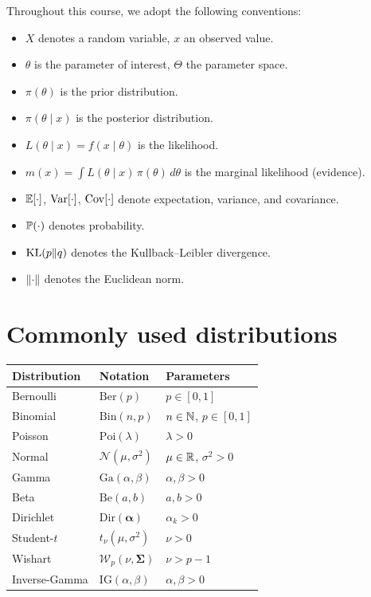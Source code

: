 Throughout this course, we adopt the following conventions:

\begin{itemize}
  \item $X$ denotes a random variable, $x$ an observed value.
  \item $\theta$ is the parameter of interest, $\Theta$ the parameter
        space.
  \item $\pi(\theta)$ is the prior distribution.
  \item $\pi(\theta \mid x)$ is the posterior distribution.
  \item $L(\theta \mid x) = f(x \mid \theta)$ is the likelihood.
  \item $m(x) = \int L(\theta \mid x)\,\pi(\theta)\,d\theta$ is the
        marginal likelihood (evidence).
  \item $\mathbb{E}[\cdot]$, $\mathrm{Var}[\cdot]$, $\mathrm{Cov}[\cdot]$ denote
        expectation, variance, and covariance.
  \item $\mathbb{P}(\cdot)$ denotes probability.
  \item $\mathrm{KL}(p \| q)$ denotes the Kullback--Leibler divergence.
  \item $\left\| \cdot \right\|$ denotes the Euclidean norm.
\end{itemize}

\section*{Commonly used distributions}

\begin{center}
\renewcommand{\arraystretch}{1.3}
\begin{tabular}{lll}
\toprule
\textbf{Distribution} & \textbf{Notation} & \textbf{Parameters} \\
\midrule
Bernoulli & $\text{Ber}(p)$ & $p \in [0,1]$ \\
Binomial & $\text{Bin}(n, p)$ & $n \in \mathbb{N}$, $p \in [0,1]$ \\
Poisson & $\text{Poi}(\lambda)$ & $\lambda > 0$ \\
Normal & $\mathcal{N}(\mu, \sigma^2)$ & $\mu \in \mathbb{R}$, $\sigma^2 > 0$ \\
Gamma & $\text{Ga}(\alpha, \beta)$ & $\alpha, \beta > 0$ \\
Beta & $\text{Be}(a, b)$ & $a, b > 0$ \\
Dirichlet & $\text{Dir}(\boldsymbol{\alpha})$ & $\alpha_k > 0$ \\
Student-$t$ & $t_\nu(\mu, \sigma^2)$ & $\nu > 0$ \\
Wishart & $\mathcal{W}_p(\nu, \boldsymbol{\Sigma})$ & $\nu > p-1$ \\
Inverse-Gamma & $\text{IG}(\alpha, \beta)$ & $\alpha, \beta > 0$ \\
\bottomrule
\end{tabular}
\end{center}

